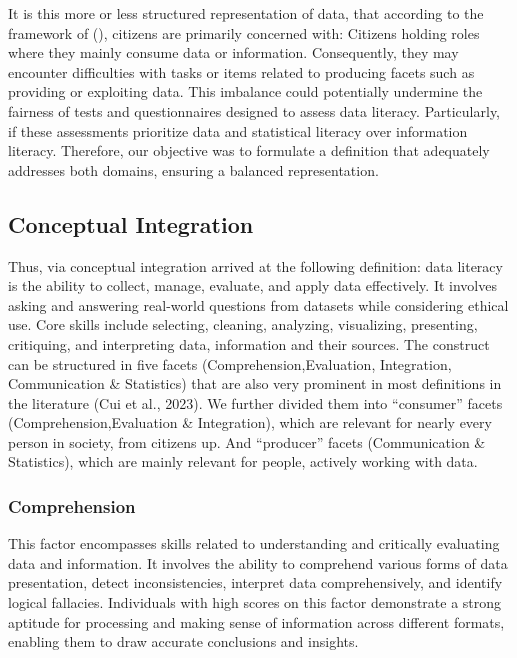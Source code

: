 \documentclass[
  12pt,
  a4paper,
  twoside]{article}
\begin{document}
It is this more or less structured representation of data, that according to the framework of (), citizens are primarily concerned with: Citizens holding roles where they mainly consume data or information. Consequently, they may encounter difficulties with tasks or items related to producing facets such as providing or exploiting data. This imbalance could potentially undermine the fairness of tests and questionnaires designed to assess data literacy. Particularly, if these assessments prioritize data and statistical literacy over information literacy. Therefore, our objective was to formulate a definition that adequately addresses both domains, ensuring a balanced representation.

\subsection{Conceptual Integration}\label{conceptual-integration}

Thus, via conceptual integration arrived at the following definition: data literacy is the ability to collect, manage, evaluate, and apply data effectively. It involves asking and answering real-world questions from datasets while considering ethical use. Core skills include selecting, cleaning, analyzing, visualizing, presenting, critiquing, and interpreting data, information and their sources.
The construct can be structured in five facets (Comprehension,Evaluation, Integration, Communication \& Statistics) that are also very prominent in most definitions in the literature (Cui et al., 2023). We further divided them into ``consumer'' facets (Comprehension,Evaluation \& Integration), which are relevant for nearly every person in society, from citizens up. And ``producer'' facets (Communication \& Statistics), which are mainly relevant for people, actively working with data.

\subsubsection{Comprehension}\label{comprehension}

This factor encompasses skills related to understanding and critically evaluating data and information. It involves the ability to comprehend various forms of data presentation, detect inconsistencies, interpret data comprehensively, and identify logical fallacies. Individuals with high scores on this factor demonstrate a strong aptitude for processing and making sense of information across different formats, enabling them to draw accurate conclusions and insights.
\end{document}
